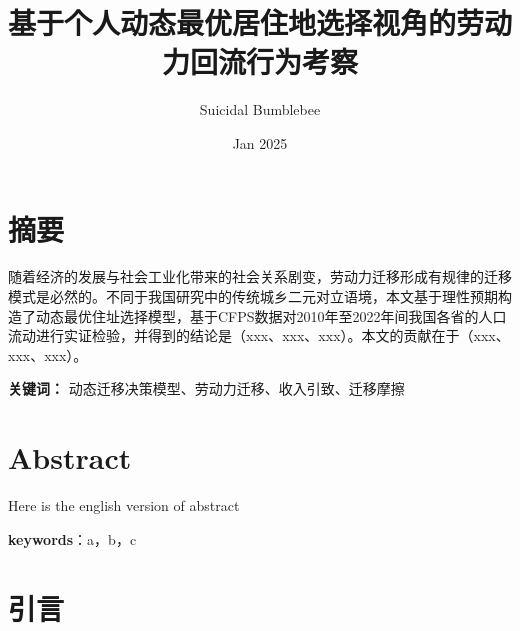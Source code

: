 \documentclass[a4paper,12pt,oneside]{book} %
\title{基于个人动态最优居住地选择视角的劳动力回流行为考察}
\author{Suicidal Bumblebee}
\date{Jan 2025}
\begin{document}
\maketitle

\frontmatter
\renewcommand{\thepage}{\Roman{page}} %
\chapter{摘要}
随着经济的发展与社会工业化带来的社会关系剧变，劳动力迁移形成有规律的迁移模式是必然的。不同于我国研究中的传统城乡二元对立语境，本文基于理性预期构造了动态最优住址选择模型，基于CFPS数据对2010年至2022年间我国各省的人口流动进行实证检验，并得到的结论是（xxx、xxx、xxx）。本文的贡献在于（xxx、xxx、xxx）。

\textbf{关键词：} 动态迁移决策模型、劳动力迁移、收入引致、迁移摩擦


\chapter{Abstract}

Here is the english version of abstract

\textbf{keywords}：a，b，c

\thispagestyle{empty}
\tableofcontents

\mainmatter
\newpage
\chapter{引言}
\end{document}
